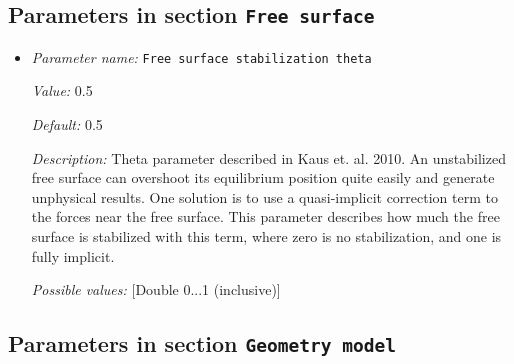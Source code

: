 \subsection{Parameters in section \tt Free surface}
\label{parameters:Free_20surface}

\begin{itemize}
\item {\it Parameter name:} {\tt Free surface stabilization theta}
\label{parameters:Free surface/Free surface stabilization theta}


{\it Value:} 0.5


{\it Default:} 0.5


{\it Description:} Theta parameter described in Kaus et. al. 2010. An unstabilized free surface can overshoot its equilibrium position quite easily and generate unphysical results.  One solution is to use a quasi-implicit correction term to the forces near the free surface.  This parameter describes how much the free surface is stabilized with this term, where zero is no stabilization, and one is fully implicit.


{\it Possible values:} [Double 0...1 (inclusive)]
\end{itemize}

\subsection{Parameters in section \tt Geometry model}
\label{parameters:Geometry_20model}


